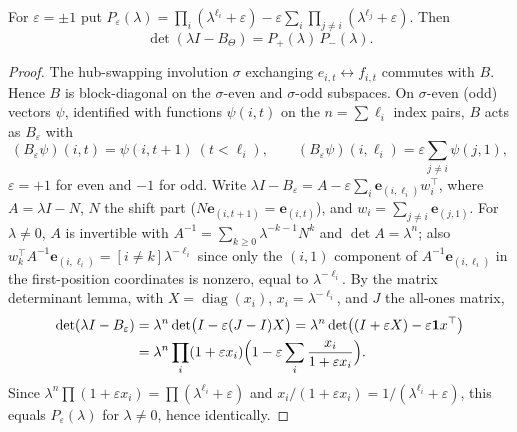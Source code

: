 \begin{theorem}\label{thm:spectrum-gen}
For $\varepsilon=\pm1$ put $P_\varepsilon(\lambda)=\prod_{i}(\lambda^{\ell_i}+\varepsilon)-\varepsilon\sum_i\prod_{j\ne i}(\lambda^{\ell_j}+\varepsilon)$. Then
\[
\det(\lambda I-B_\Theta)=P_{+}(\lambda)\,P_{-}(\lambda).
\]
\end{theorem}
\begin{proof}
The hub-swapping involution $\sigma$ exchanging $e_{i,t}\leftrightarrow f_{i,t}$ commutes with $B$. Hence $B$ is block-diagonal on the $\sigma$-even and $\sigma$-odd subspaces. On $\sigma$-even (odd) vectors $\psi$, identified with functions $\psi(i,t)$ on the $n=\sum\ell_i$ index pairs, $B$ acts as $B_\varepsilon$ with
\[
(B_\varepsilon\psi)(i,t)=\psi(i,t+1)\ (t<\ell_i),\qquad(B_\varepsilon\psi)(i,\ell_i)=\varepsilon\sum_{j\ne i}\psi(j,1),
\]
$\varepsilon=+1$ for even and $-1$ for odd. Write $\lambda I-B_\varepsilon=A-\varepsilon\sum_{i}\mathbf e_{(i,\ell_i)}w_i^\top$, where $A=\lambda I-N$, $N$ the shift part ($N\mathbf e_{(i,t+1)}=\mathbf e_{(i,t)}$), and $w_i=\sum_{j\ne i}\mathbf e_{(j,1)}$. For $\lambda\ne0$, $A$ is invertible with $A^{-1}=\sum_{k\ge0}\lambda^{-k-1}N^k$ and $\det A=\lambda^n$; also $w_k^\top A^{-1}\mathbf e_{(i,\ell_i)}=[i\ne k]\lambda^{-\ell_i}$ since only the $(i,1)$ component of $A^{-1}\mathbf e_{(i,\ell_i)}$ in the first-position coordinates is nonzero, equal to $\lambda^{-\ell_i}$. By the matrix determinant lemma, with $X=\operatorname{diag}(x_i)$, $x_i=\lambda^{-\ell_i}$, and $J$ the all-ones matrix,
\[
\begin{aligned}
\det(\lambda I-B_\varepsilon)&=\lambda^n\det\bigl(I-\varepsilon(J-I)X\bigr)=\lambda^n\det\bigl((I+\varepsilon X)-\varepsilon\mathbf{1} x^\top\bigr)\\
&=\lambda^n\prod_i(1+\varepsilon x_i)\Bigl(1-\varepsilon\sum_i\frac{x_i}{1+\varepsilon x_i}\Bigr).
\end{aligned}
\]
Since $\lambda^n\prod(1+\varepsilon x_i)=\prod(\lambda^{\ell_i}+\varepsilon)$ and $x_i/(1+\varepsilon x_i)=1/(\lambda^{\ell_i}+\varepsilon)$, this equals $P_\varepsilon(\lambda)$ for $\lambda\ne0$, hence identically. \qedhere
\end{proof}
